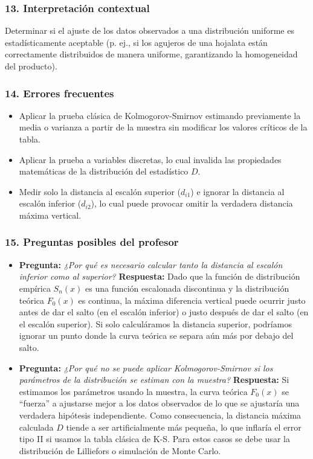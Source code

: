 \documentclass[11pt,a4paper]{article}
\begin{document}
\subsubsection{13. Interpretación contextual}
Determinar si el ajuste de los datos observados a una distribución uniforme es estadísticamente aceptable (p. ej., si los agujeros de una hojalata están correctamente distribuidos de manera uniforme, garantizando la homogeneidad del producto).

\subsubsection{14. Errores frecuentes}
\begin{itemize}
    \item Aplicar la prueba clásica de Kolmogorov-Smirnov estimando previamente la media o varianza a partir de la muestra sin modificar los valores críticos de la tabla.
    \item Aplicar la prueba a variables discretas, lo cual invalida las propiedades matemáticas de la distribución del estadístico $D$.
    \item Medir solo la distancia al escalón superior ($d_{i1}$) e ignorar la distancia al escalón inferior ($d_{i2}$), lo cual puede provocar omitir la verdadera distancia máxima vertical.
\end{itemize}

\subsubsection{15. Preguntas posibles del profesor}
\begin{itemize}
    \item \textbf{Pregunta:} \textit{¿Por qué es necesario calcular tanto la distancia al escalón inferior como al superior?}
    \textbf{Respuesta:} Dado que la función de distribución empírica $S_n(x)$ es una función escalonada discontinua y la distribución teórica $F_0(x)$ es continua, la máxima diferencia vertical puede ocurrir justo antes de dar el salto (en el escalón inferior) o justo después de dar el salto (en el escalón superior). Si solo calculáramos la distancia superior, podríamos ignorar un punto donde la curva teórica se separa aún más por debajo del salto.
    \item \textbf{Pregunta:} \textit{¿Por qué no se puede aplicar Kolmogorov-Smirnov si los parámetros de la distribución se estiman con la muestra?}
    \textbf{Respuesta:} Si estimamos los parámetros usando la muestra, la curva teórica $F_0(x)$ se ``fuerza'' a ajustarse mejor a los datos observados de lo que se ajustaría una verdadera hipótesis independiente. Como consecuencia, la distancia máxima calculada $D$ tiende a ser artificialmente más pequeña, lo que inflaría el error tipo II si usamos la tabla clásica de K-S. Para estos casos se debe usar la distribución de Lilliefors o simulación de Monte Carlo.
\end{itemize}
\end{document}
